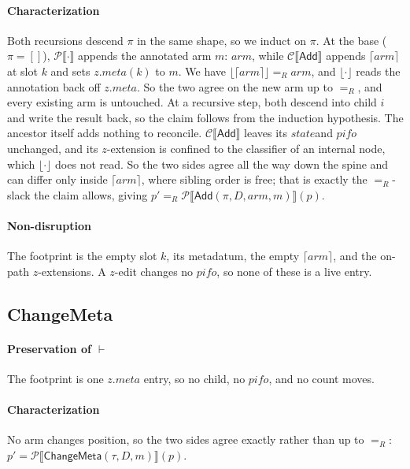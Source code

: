 \documentclass[sigplan,anonymous,review,nonacm]{acmart}
\newcommand{\csem}[1]{\mathcal{C}\llbracket #1 \rrbracket}
\newcommand{\psem}[1]{\mathcal{P}\llbracket #1 \rrbracket}
\newcommand{\eqR}{=_R}
\newcommand{\notation}[1]{\ensuremath{#1}\ifmmode\else\xspace\fi}
\newcommand{\pifo}{\notation{\mathit{pifo}}}
\newcommand{\zz}{\notation{\mathit{z}}}
\newcommand{\stt}{\notation{\mathit{state}}}
\newcommand{\Add}{\textsf{Add}}
\newcommand{\ChangeMeta}{\textsf{ChangeMeta}}
\begin{document}
\paragraph{Characterization}
Both recursions descend \(\pi\) in the same shape, so we induct on \(\pi\).
At the base (\(\pi = []\)), \(\psem{\cdot}\) appends the annotated arm \(m{:}\,\mathit{arm}\), while \(\csem{\Add}\) appends \(\lceil \mathit{arm} \rceil\) at slot \(k\) and sets \(\mathit{z}.\mathit{meta}(k)\) to \(m\).
We have \(\lfloor \lceil \mathit{arm} \rceil \rfloor \eqR \mathit{arm}\), and \(\lfloor \cdot \rfloor\) reads the annotation back off \(\mathit{z}.\mathit{meta}\).
So the two agree on the new arm up to \(\eqR\), and every existing arm is untouched.
At a recursive step, both descend into child \(i\) and write the result back, so the claim follows from the induction hypothesis.
The ancestor itself adds nothing to reconcile.
\(\csem{\Add}\) leaves its \stt and \pifo unchanged, and its \zz-extension is confined to the classifier of an internal node, which \(\lfloor \cdot \rfloor\) does not read.
So the two sides agree all the way down the spine and can differ only inside \(\lceil \mathit{arm} \rceil\), where sibling order is free; that is exactly the \(\eqR\)-slack the claim allows, giving \(p' \eqR \psem{\Add(\pi, D, \mathit{arm}, m)}(p)\).

\paragraph{Non-disruption}
The footprint is the empty slot \(k\), its metadatum, the empty \(\lceil \mathit{arm} \rceil\), and the on-path \zz-extensions.
A \zz-edit changes no \pifo, so none of these is a live entry.

\subsection{\texorpdfstring{\ChangeMeta}{ChangeMeta}}\label{sec:check-changemeta}

\paragraph{Preservation of \(\vdash\)}
The footprint is one \(\mathit{z}.\mathit{meta}\) entry, so no child, no \pifo, and no count moves.

\paragraph{Characterization}
No arm changes position, so the two sides agree exactly rather than up to \(\eqR\): \(p' = \psem{\ChangeMeta(\tau, D, m)}(p)\).
\end{document}
